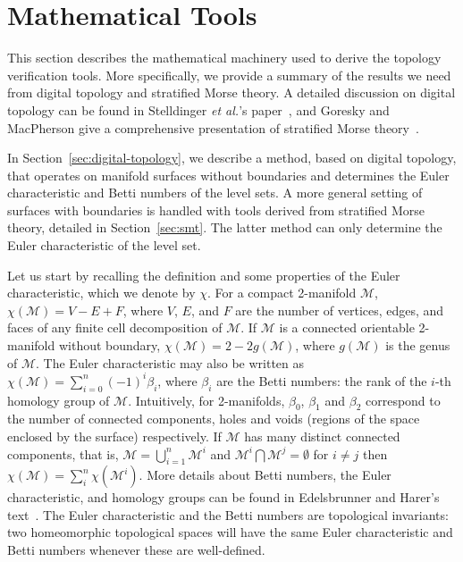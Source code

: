 \section{Mathematical Tools}
\label{sec:math-foundations}

This section describes the mathematical machinery used to derive the
topology verification tools. More specifically, we provide a summary
of the results we need from digital topology and stratified Morse
theory.  A detailed discussion on digital topology can be found in
Stelldinger \emph{et al.}'s paper~\cite{siqueira:2007}, and Goresky and
MacPherson give a comprehensive presentation of stratified Morse
theory~\cite{Goresky:1988:SMT}.

In Section~\ref{sec:digital-topology}, we describe a method, based on
digital topology, that operates on manifold surfaces without
boundaries and determines the Euler characteristic and Betti numbers
of the level sets. A more general setting of surfaces with boundaries
is handled with tools derived from stratified Morse theory, detailed
in Section~\ref{sec:smt}.  The latter method can only determine the
Euler characteristic of the level set.

Let us start by recalling the definition and some properties of the
Euler characteristic, which we denote by $\chi$. For a compact
2-manifold $\mathcal{M}$, $\chi(\mathcal{M}) = V - E + F$, where $V$,
$E$, and $F$ are the number of vertices, edges, and faces of any finite
cell decomposition of $\mathcal{M}$. If $\mathcal{M}$ is a connected
orientable 2-manifold without boundary, $\chi(\mathcal{M}) = 2 -
2g(\mathcal{M})$, where $g(\mathcal{M})$ is the genus of
$\mathcal{M}$. The Euler characteristic may also be written as
$\chi(\mathcal{M}) = \sum_{i=0}^n(-1)^i \beta_i$, where $\beta_i$ are
the Betti numbers: the rank of the $i$-th homology group of
$\mathcal{M}$.
Intuitively, for 2-manifolds, $\beta_0$, $\beta_1$ and $\beta_2$
correspond to the number of connected components, holes and voids
(regions of the space enclosed by the surface) respectively.  If
$\mathcal{M}$ has many distinct connected components, that is,
$\mathcal{M} = \bigcup^n_{i = 1} \mathcal{M}^i$ and $\mathcal{M}^i
\bigcap \mathcal{M}^j = \emptyset$ for $i \neq j$ then
$\chi(\mathcal{M}) = \sum_{i}^n \chi(\mathcal{M}^i)$. More details
about Betti numbers, the Euler characteristic, and homology groups can
be found in Edelsbrunner and Harer's text~\cite{edelsbrunner10}. The
Euler characteristic and the Betti numbers are topological invariants:
two homeomorphic topological spaces will have the same Euler
characteristic and Betti numbers whenever these are well-defined.


